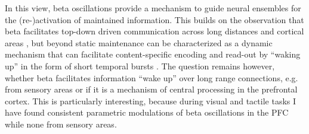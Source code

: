In this view, beta oscillations provide a mechanism to guide neural ensembles for the (re-)activation of maintained information. This builds on the observation that beta facilitates top-down driven communication across long distances and cortical areas \parencite{Antzoulatos2016,Arnal2012,Bastos2015,Engel2010,Michalareas2016,Sejnowski2006,Siegel2012,Varela2001,Wang2010}, but beyond static maintenance can be characterized as a dynamic mechanism that can facilitate content-specific encoding and read-out by “waking up” in the form of short temporal bursts \parencite{Fries2015,Jones2016,Lundqvist2018,Spitzer2017}. The question remains however, whether beta facilitates information “wake up” over long range connections, e.g. from sensory areas or if it is a mechanism of central processing in the prefrontal cortex. This is particularly interesting, because during visual and tactile tasks I have found consistent parametric modulations of beta oscillations in the PFC while none from sensory areas.
